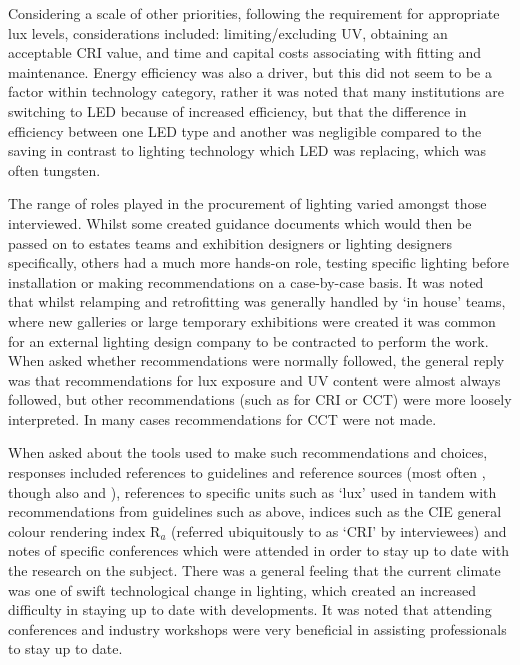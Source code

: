Considering a scale of other priorities, following the requirement for appropriate lux levels, considerations included: limiting/excluding \gls{UV}, obtaining an acceptable \gls{CRI} value, and time and capital costs associating with fitting and maintenance. Energy efficiency was also a driver, but this did not seem to be a factor within technology category, rather it was noted that many institutions are switching to \gls{LED} because of increased efficiency, but that the difference in efficiency between one \gls{LED} type and another was negligible compared to the saving in contrast to lighting technology which \gls{LED} was replacing, which was often tungsten.

The range of roles played in the procurement of lighting varied amongst those interviewed. Whilst some created guidance documents which would then be passed on to estates teams and exhibition designers or lighting designers specifically, others had a much more hands-on role, testing specific lighting before installation or making recommendations on a case-by-case basis. It was noted that whilst relamping and retrofitting was generally handled by `in house' teams, where new galleries or large temporary exhibitions were created it was common for an external lighting design company to be contracted to perform the work. When asked whether recommendations were normally followed, the general reply was that recommendations for lux exposure and UV content were almost always followed, but other recommendations (such as for \gls{CRI} or \gls{CCT}) were more loosely interpreted. In many cases recommendations for \gls{CCT} were not made.

When asked about the tools used to make such recommendations and choices, responses included references to guidelines and reference sources (most often \citet{thomson_museum_1986}, though also \citet{druzik_guidelines_2012} and \citet{british_standards_institution_pas_2012}), references to specific units such as `lux' used in tandem with recommendations from guidelines such as above, indices such as the \gls{CIE} general colour rendering index R$_a$ (referred ubiquitously to as `\gls{CRI}' by interviewees) and notes of specific conferences which were attended in order to stay up to date with the research on the subject. There was a general feeling that the current climate was one of swift technological change in lighting, which created an increased difficulty in staying up to date with developments. It was noted that attending conferences and industry workshops were very beneficial in assisting professionals to stay up to date. 

